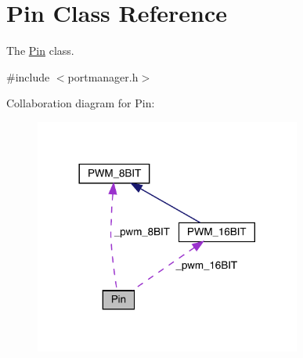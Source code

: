 \hypertarget{classPin}{}\section{Pin Class Reference}
\label{classPin}


The \mbox{\hyperlink{classPin}{Pin}} class.  




{\ttfamily \#include $<$portmanager.\+h$>$}



Collaboration diagram for Pin\+:\nopagebreak
\begin{figure}[H]
\begin{center}
\leavevmode
\includegraphics[width=248pt]{classPin__coll__graph}
\end{center}
\end{figure}
